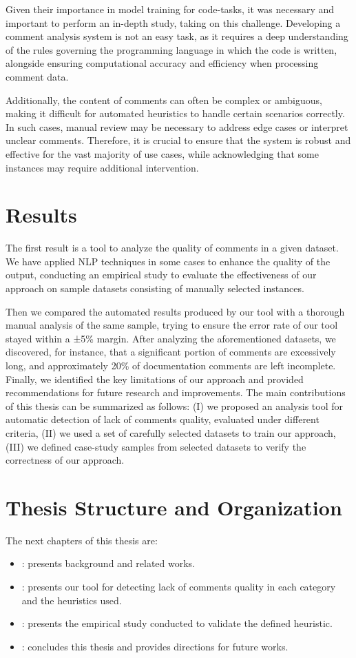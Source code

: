 \noindent Given their importance in model training for code-tasks, it was necessary and important to perform an in-depth study, taking on this challenge. Developing a comment analysis system \cite{commentAnalysis} is not an easy task, as it requires a deep understanding of the rules governing the programming language in which the code is written, alongside ensuring computational accuracy and efficiency when processing comment data.

\noindent Additionally, the content of comments can often be complex or ambiguous, making it difficult for automated heuristics to handle certain scenarios correctly. In such cases, manual review may be necessary to address edge cases or interpret unclear comments.
Therefore, it is crucial to ensure that the system is robust and effective for the vast majority of use cases, while acknowledging that some instances may require additional intervention.

\section{Results}
The first result is a tool to analyze the quality of comments in a given dataset. We have applied NLP techniques in some cases to enhance the quality of the output, conducting an empirical study to evaluate the effectiveness of our approach on sample datasets consisting of manually selected instances.

\noindent Then we compared the automated results produced by our tool with a thorough manual analysis of the same sample, trying to ensure the error rate of our tool stayed within a ±5\% margin. 
After analyzing the aforementioned datasets, we discovered, for instance, that a significant portion of comments are excessively long, and approximately 20\% of documentation comments are left incomplete. Finally, we identified the key limitations of our approach and provided recommendations for future research and improvements. The main contributions of this thesis can be summarized as follows:
(I) we proposed an analysis tool for automatic detection of lack of comments quality, evaluated under different criteria,
(II) we used a set of carefully selected datasets to train our approach,
(III) we defined case-study samples from selected datasets to verify the correctness of our approach.

\section{Thesis Structure and Organization}
The next chapters of this thesis are:

\begin{itemize}
\item {}: presents background and related works.
\item {}: presents our tool for detecting lack of comments quality in each category and the heuristics used.
\item {}: presents the empirical study conducted to validate the
defined heuristic.
\item {}: concludes this thesis and provides directions for future works.
\end{itemize}